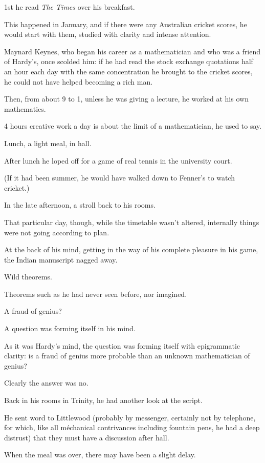 \documentclass{article}
\numberwithin{equation}{section}
\begin{document}
1st he read \textit{The Times} over his breakfast.

This happened in January, and if there were any Australian cricket scores, he would start with them, studied with clarity and intense attention.

%
Maynard Keynes, who began his career as a mathematician and who was a friend of Hardy's, once scolded him: if he had read the stock exchange quotations half an hour each day with the same concentration he brought to the cricket scores, he could not have helped becoming a rich man.

%
Then, from about 9 to 1, unless he was giving a lecture, he worked at his own mathematics.

4 hours creative work a day is about the limit of a mathematician, he used to say.

Lunch, a light meal, in hall.

After lunch he loped off for a game of real tennis in the university court.

(If it had been summer, he would have walked down to Fenner's to watch cricket.)

In the late afternoon, a stroll back to his rooms.

That particular day, though, while the timetable wasn't altered, internally things were not going according to plan.

At the back of his mind, getting in the way of his complete pleasure in his game, the Indian manuscript nagged away.

Wild theorems.

Theorems such as he had never seen before, nor imagined.

A fraud of genius?

A question was forming itself in his mind.

As it was Hardy's mind, the question was forming itself with epigrammatic clarity: is a fraud of genius more probable than an unknown mathematician of genius?

Clearly the answer was no.

Back in his rooms in Trinity, he had another look at the script.

He sent word to Littlewood (probably by messenger, certainly not by telephone, for which, like all m\'echanical contrivances including fountain pens, he had a deep distrust) that they must have a discussion after hall.

%
When the meal was over, there may have been a slight delay.
\end{document}

